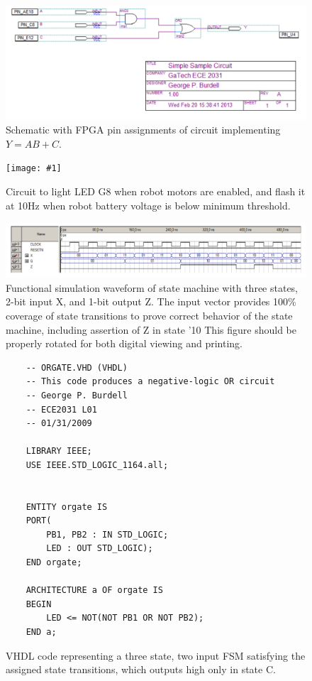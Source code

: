\documentclass[letterpaper,11pt]{article}
\newcommand{\labfig}[2]{ %
\begin{figure}
\texttt{[image: \#1]}
\caption{#2}
\end{figure}
}
\begin{document}
\begin{figure}
   \includegraphics{simple_circuit.png} %
      \caption{Schematic with FPGA pin assignments of circuit implementing $Y = AB + C$.} %
\end{figure}   



\labfig{complicated_circuit.png}{Circuit to light LED G8 when robot motors are enabled, and flash it at 10Hz when robot battery voltage is below minimum threshold.} %

\begin{landscape} %
\begin{figure}
	\includegraphics{landscape_figure.png}
	  \caption{Functional simulation waveform of state machine with three states, 2-bit input X, and 1-bit output Z. The input vector provides 100\% coverage of state transitions to prove correct behavior of the state machine, including assertion of Z in state '10 This figure should be properly rotated for both digital viewing and printing.}
\end{figure}
\end{landscape}

\begin{figure} %
	\begin{lstlisting} 
	-- ORGATE.VHD (VHDL)
	-- This code produces a negative-logic OR circuit
	-- George P. Burdell
	-- ECE2031 L01
	-- 01/31/2009
	
	LIBRARY IEEE;
	USE IEEE.STD_LOGIC_1164.all;


	ENTITY orgate IS
	PORT(
		PB1, PB2 : IN STD_LOGIC;
		LED : OUT STD_LOGIC);
	END orgate;

	ARCHITECTURE a OF orgate IS
	BEGIN
		LED <= NOT(NOT PB1 OR NOT PB2);
	END a;
	\end{lstlisting}
	\caption{VHDL code representing a three state, two input FSM satisfying the assigned state transitions, which outputs high only in state C.} %
\end{figure}
\end{document}
